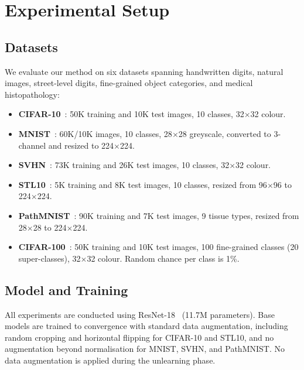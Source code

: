 \documentclass{article}
\newcommand{\new}[1]{{\color{orange}#1}}
\begin{document}
\section{Experimental Setup}\label{sec:setup}

\subsection{Datasets}

We evaluate our method on \new{six} datasets spanning handwritten digits, natural images, street-level digits, \new{fine-grained object categories,} and medical histopathology:

\begin{itemize}[nosep,leftmargin=*]
  \item \textbf{CIFAR-10}~\cite{krizhevsky2009cifar}: 50K training and 10K test images, 10 classes, 32$\times$32 colour.
  \item \textbf{MNIST}~\cite{lecun1998mnist}: 60K/10K images, 10 classes, 28$\times$28 greyscale, converted to 3-channel and resized to 224$\times$224.
  \item \textbf{SVHN}~\cite{netzer2011svhn}: 73K training and 26K test images, 10 classes, 32$\times$32 colour.
  \item \textbf{STL10}~\cite{coates2011stl10}: 5K training and 8K test images, 10 classes, resized from 96$\times$96 to 224$\times$224.
  \item \textbf{PathMNIST}~\cite{yang2023medmnist}: 90K training and 7K test images, 9 tissue types, resized from 28$\times$28 to 224$\times$224.
  \item \new{\textbf{CIFAR-100}~\cite{krizhevsky2009cifar}: 50K training and 10K test images, 100 fine-grained classes (20 super-classes), 32$\times$32 colour. Random chance per class is 1\%.}
\end{itemize}

\subsection{Model and Training}

All experiments are conducted using ResNet-18~\cite{he2016resnet} (11.7M parameters).
Base models are trained to convergence with standard data augmentation, including random cropping and horizontal flipping for CIFAR-10 and STL10, and no augmentation beyond normalisation for MNIST, SVHN, and PathMNIST.
No data augmentation is applied during the unlearning phase.
\end{document}
